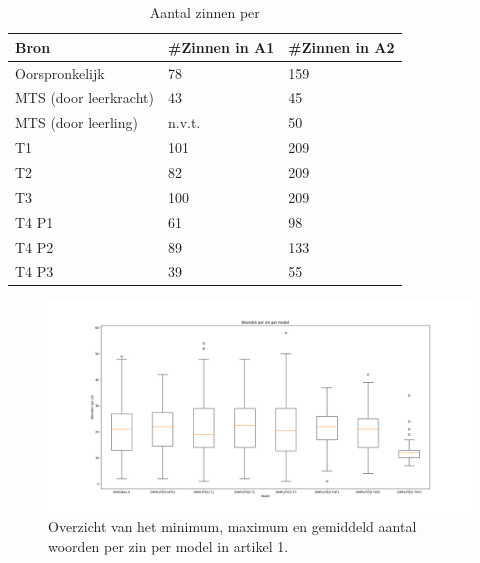 \chapter{}%
\label{ch:afbeeldingen-resultaten-verg-studie}


\begin{table}[h]
	\centering
	\begin{tabular}{ | m{3cm} | m{3cm} | m{3cm} | } 
		\hline
		Bron & #Zinnen in A1 & #Zinnen in A2 \\
		\hline
		Oorspronkelijk & 78  & 159 \\ 
		\hline
		MTS (door leerkracht) & 43 & 45 \\
		\hline
		MTS (door leerling) & n.v.t. & 50 \\
		\hline
		T1 & 101 & 209 \\
		\hline
		T2 & 82 & 209 \\
		\hline
		T3 & 100 & 209 \\
		\hline
		T4 P1 & 61 & 98 \\
		\hline
		T4 P2 & 89 & 133 \\
		\hline
		T4 P3 & 39 & 55 \\
		\hline
	\end{tabular}
	\label{table:resultaten-aantal-woorden}
	\caption{Aantal zinnen per }
\end{table}


\begin{figure}
	\includegraphics[width=\linewidth]{img/boxplot-avg-a1.png}
	\caption{Overzicht van het minimum, maximum en gemiddeld aantal woorden per zin per model in artikel 1.}
	\label{img:boxplot-min-max-avg-words-a1}
\end{figure}

